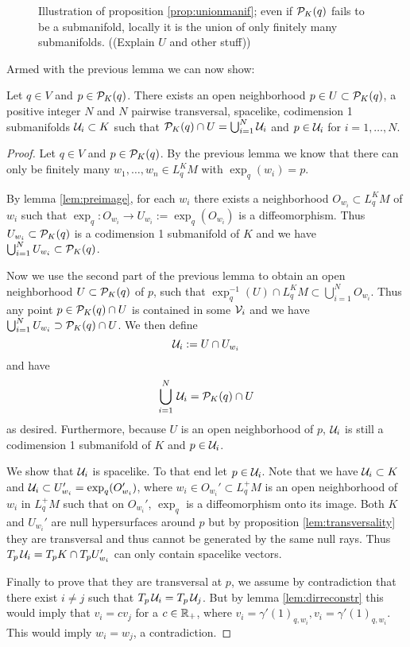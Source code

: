 \begin{figure}\label{fig:UnionOfManif}
    \centering
    
    \caption{
        Illustration of proposition \ref{prop:unionmanif}; even if ${{\mathcal{P}}_K(q)}$ fails to be a submanifold, locally it is the union of only finitely many submanifolds. ((Explain $U$ and other stuff))
    }
\end{figure}

Armed with the previous lemma we can now show:
\begin{proposition}\label{prop:unionmanif}
Let $q\in V$ and $p\in {\mathcal{P}}_K(q)$. There exists an open neighborhood $p\in U\subset {\mathcal{P}}_K(q)$, a positive integer $N$ and $N$ pairwise transversal, spacelike, codimension 1 submanifolds ${\mathcal{U}}_i\subset K$ such that ${\mathcal{P}}_K(q) \cap U = \bigcup_{i=1}^N {\mathcal{U}}_i$ and $p\in {\mathcal{U}}_i$ for $i={1,\dots, N}$.
\end{proposition}
\begin{proof}
    Let $q\in V$ and $p\in {\mathcal{P}}_K(q)$. By the previous lemma we know that there can only be finitely many $w_1,\dots,w_n\in L^K_qM$ with $\exp_q(w_i)=p$. 

    By lemma \ref{lem:preimage}, for each $w_i$ there exists a neighborhood $O_{w_i}\subset L^K_qM$ of $w_i$ such that $\exp_q:O_{w_i}\to U_{w_i}:=\exp_q(O_{w_i})$ is a diffeomorphism. Thus $U_{w_i}\subset {\mathcal{P}}_K(q)$ is a codimension 1 submanifold of $K$ and we have $\bigcup_{i=1}^N U_{w_i}\subset {\mathcal{P}}_K(q)$.

    Now we use the second part of the previous lemma to obtain an open neighborhood $U\subset {\mathcal{P}}_K(q)$ of $p$, such that $\exp_q^{-1}(U)\cap L^K_qM\subset \bigcup_{i=1}^N O_{w_i}$. Thus any point $p\in {\mathcal{P}}_K(q) \cap U$ is contained in some ${\mathcal{V}}_i$ and we have $\bigcup_{i=1}^N U_{w_i} \supset {\mathcal{P}}_K(q)\cap U$. 
    We then define 
    \[
        \mathcal{U}_i := U \cap U_{w_i}
    \] and have 
    \[
        \bigcup_{i=1}^N \,\mathcal{U}_i = {\mathcal{P}}_K(q)\cap U
    \] as desired. Furthermore, because $U$ is an open neighborhood of $p$, $\mathcal{U}_i$ is still a codimension 1 submanifold of $K$ and $p\in \mathcal{U}_i$.

    We show that $\mathcal{U}_i$ is spacelike. To that end let $p\in \mathcal{U}_i$. Note that we have $\mathcal{U}_i\subset K$ and $\mathcal{U}_i\subset U_{w_i}' = \exp_q(O_{w_i}')$, where $w_i\in O_{w_i}' \subset L^+_qM$ is an open neighborhood of $w_i$ in $L^+_qM$ such that on $O_{w_i}'$, $\exp_q$ is a diffeomorphism onto its image. Both $K$ and $U_{w_i}'$ are null hypersurfaces around $p$ but by proposition \ref{lem:transversality} they are transversal and thus cannot be generated by the same null rays. Thus $T_p\,\mathcal{U}_i = T_pK \cap T_pU_{w_i}'$ can only contain spacelike vectors.

    Finally to prove that they are transversal at $p$, we assume by contradiction that there exist $i\neq j$ such that $T_p\,\mathcal{U}_i=T_p\,\mathcal{U}_j$. But by lemma \ref{lem:dirreconstr} this would imply that $v_i = cv_j$ for a $c\in \mathbb{R}_+$, where $v_i = \gamma'(1)_{q,w_i}, v_i = \gamma'(1)_{q,w_i}$. This would imply $w_i = w_j$, a contradiction.
\end{proof}

